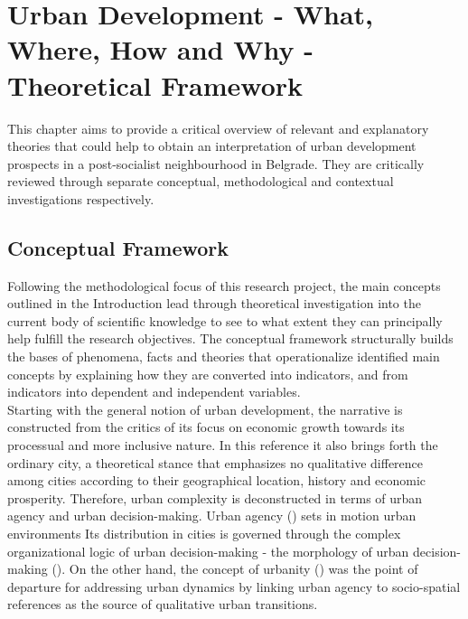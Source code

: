 \documentclass[11pt]{report}
\begin{document}

\chapter{Urban Development - What, Where, How and Why - Theoretical Framework}


This chapter aims to provide a critical overview of relevant and explanatory theories that could help to obtain an interpretation of urban development prospects in a post-socialist neighbourhood in Belgrade.
They are critically reviewed through separate conceptual, methodological and contextual investigations respectively.

\section{Conceptual Framework}

Following the methodological focus of this research project, the main concepts outlined in the Introduction lead through theoretical investigation into the current body of scientific knowledge to see to what extent they can principally help fulfill the research objectives. 
The conceptual framework structurally builds the bases of phenomena, facts and theories that operationalize identified main concepts by explaining how they are converted into indicators, and from indicators into dependent and independent variables.
\\

Starting with the general notion of urban development, the narrative is constructed from the critics of its focus on economic growth towards its processual and more inclusive nature.
In this reference it also brings forth the ordinary city, a theoretical stance that emphasizes no qualitative difference among cities according to their geographical location, history and economic prosperity.
Therefore, urban complexity is deconstructed in terms of urban agency and urban decision-making.
Urban agency (\href{}{\cite{all ref????}}) sets in motion urban environments
Its distribution in cities is governed through the complex organizational logic of urban decision-making - the morphology of urban decision-making (\href{}{\cite{all ref????}}).
On the other hand, the concept of urbanity (\href{}{\cite{all ref????}}) was the point of departure for addressing urban dynamics by linking urban agency to socio-spatial references as the source of qualitative urban transitions.
\\
\end{document}
